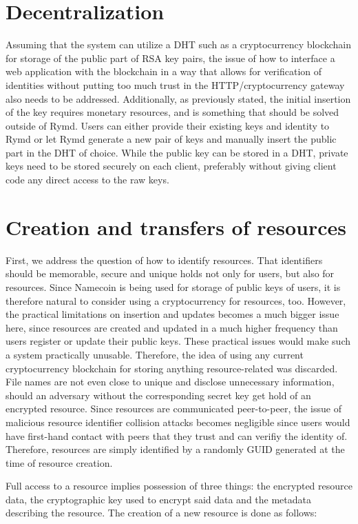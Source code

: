 \section{Decentralization}
Assuming that the system can utilize a DHT such as a cryptocurrency blockchain for storage of the public part of RSA key pairs, the issue of how to interface a web application with the blockchain in a way that allows for verification of identities without putting too much trust in the HTTP/cryptocurrency gateway also needs to be addressed. Additionally, as previously stated, the initial insertion of the key requires monetary resources, and is something that should be solved outside of Rymd. Users can either provide their existing keys and identity to Rymd or let Rymd generate a new pair of keys and manually insert the public part in the DHT of choice.
While the public key can be stored in a DHT, private keys need to be stored securely on each client, preferably without giving client code any direct access to the raw keys.

\section{Creation and transfers of resources}
First, we address the question of how to identify resources. That identifiers should be memorable, secure and unique holds not only for users, but also for resources. Since Namecoin is being used for storage of public keys of users, it is therefore natural to consider using a cryptocurrency for resources, too. However, the practical limitations on insertion and updates becomes a much bigger issue here, since resources are created and updated in a much higher frequency than users register or update their public keys. These practical issues would make such a system practically unusable. Therefore, the idea of using any current cryptocurrency blockchain for storing anything resource-related was discarded. File names are not even close to unique and disclose unnecessary information, should an adversary without the corresponding secret key get hold of an encrypted resource. Since resources are communicated peer-to-peer, the issue of malicious resource identifier collision attacks becomes negligible since users would have first-hand contact with peers that they trust and can verifiy the identity of. Therefore, resources are simply identified by a randomly GUID generated at the time of resource creation.

Full access to a resource implies possession of three things: the encrypted resource data, the cryptographic key used to encrypt said data and the metadata describing the resource. The creation of a new resource is done as follows:

